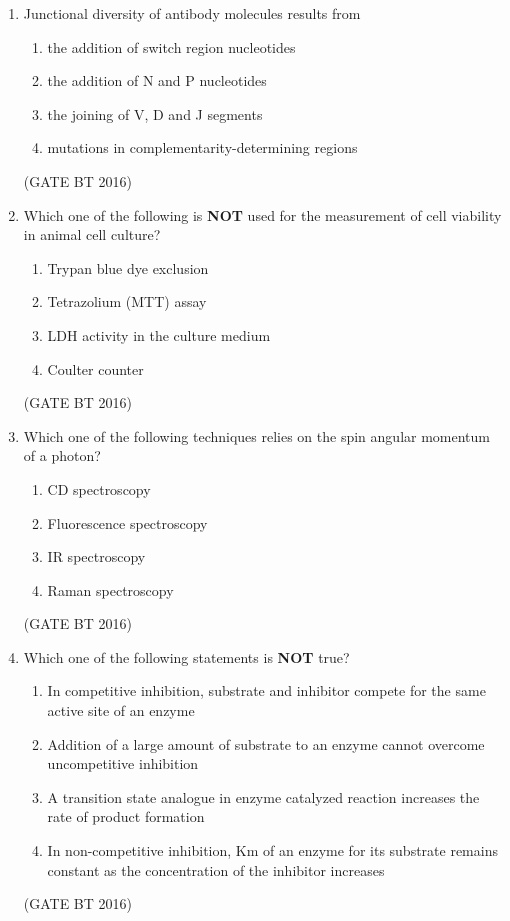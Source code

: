 \documentclass[journal,12pt,onecolumn]{IEEEtran}
\theoremstyle{remark}
\begin{document}
\begin{enumerate}
\item  Junctional diversity of antibody molecules results from
 \begin{multicols}{2}
\begin{enumerate}
\item the addition of switch region nucleotides
\item the addition of N and P nucleotides
\item  the joining of V, D and J segments
\item  mutations in complementarity-determining regions
\end{enumerate}
\end{multicols} \hfill(GATE BT 2016)  

\item  Which one of the following is \textbf{ NOT} used for the measurement of cell viability in animal cell culture?
\begin{multicols}{2}
\begin{enumerate}
\item Trypan blue dye exclusion
\item Tetrazolium (MTT) assay
\item LDH activity in the culture medium
\item Coulter counter
\end{enumerate}
\end{multicols} \hfill(GATE BT 2016)  

\item Which one of the following techniques relies on the spin angular momentum of a photon?
\begin{multicols}{2}
\begin{enumerate}
\item CD spectroscopy	
\item Fluorescence spectroscopy
\item IR spectroscopy	 
\item Raman spectroscopy
\end{enumerate}
\end{multicols} \hfill(GATE BT 2016)   


\item  Which one of the following statements is \textbf{NOT} true?
\begin{enumerate} 
\item In competitive inhibition, substrate and inhibitor compete for the same active site of an enzyme
 \item  Addition of a large amount of substrate to an enzyme cannot overcome uncompetitive inhibition
 \item  A transition state analogue in enzyme catalyzed reaction increases the rate of product formation
\item  In non-competitive inhibition, Km of an enzyme for its substrate remains constant as the concentration of the inhibitor increases
\end{enumerate}\hfill(GATE BT 2016) 


\end{enumerate}
\end{document}
